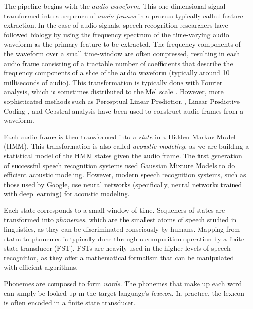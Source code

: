 \documentclass{article}
\begin{document}
\begin{figure}\begin{center}
  \label{fig:recognition}
  \caption{}
\end{center}\end{figure}

The pipeline begins with the \textit{audio waveform}.
This one-dimensional signal transformed
into a sequence of \textit{audio frames}
in a process typically called feature extraction.
In the case of audio signals,
speech recognition researchers have followed
biology by using the frequency spectrum
of the time-varying audio waveform
as the primary feature to be extracted.
The frequency components of the waveform
over a small time-window are often compressed,
resulting in each audio frame consisting of
a tractable number of coefficients
that describe the frequency components
of a slice of the audio waveform
(typically around 10 milliseconds of audio).
This transformation is typically done
with Fourier analysis,
which is sometimes distributed
to the Mel scale \citep{stevens1937}.
However, more sophisticated methods
such as Perceptual Linear Prediction \citep{hermansky1990},
Linear Predictive Coding \citep{oshaughnessy1988},
and Cepstral analysis \citep{furui1981} have been
used to construct audio frames from a waveform.

Each audio frame is then transformed
into a \textit{state}
in a Hidden Markov Model (HMM).
This transformation is also called
\textit{acoustic modeling},
as we are building a statistical model
of the HMM states given the audio frame.
The first generation of successful
speech recognition systems
used Gaussian Mixture Models
to do efficient acoustic modeling.
However, modern speech recognition systems,
such as those used by Google,
use neural networks
(specifically, neural networks trained with deep learning)
for acoustic modeling.

Each state corresponds to a small window of time.
Sequences of states are transformed
into \textit{phonemes},
which are the smallest atoms of speech
studied in linguistics,
as they can be discriminated consciously by humans.
Mapping from states to phonemes
is typically done through a composition operation
by a finite state transducer (FST).
FSTs are heavily used in the higher levels
of speech recognition,
as they offer a mathematical formalism
that can be manipulated with efficient algorithms.

Phonemes are composed to form \textit{words}.
The phonemes that make up each word
can simply be looked up
in the target language's \textit{lexicon}.
In practice, the lexicon is often encoded
in a finite state transducer.
\end{document}
